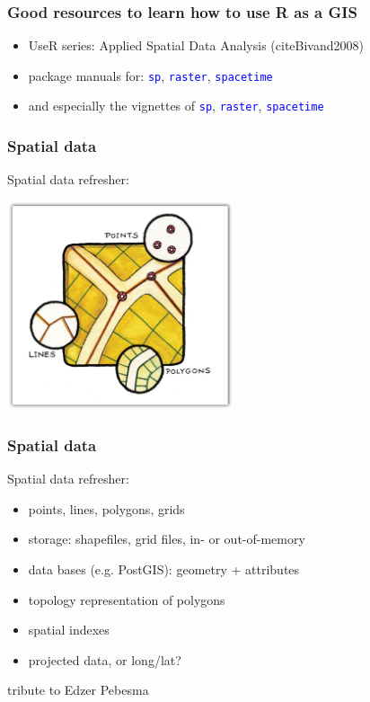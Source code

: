 \documentclass[xcolor=table, xcolor=dvipsnames]{beamer}\usepackage[]{graphicx}\usepackage[]{color}
\newcommand{\rcode}[1]{\texttt{\textcolor{Blue}{#1}}} %
\begin{document}
\begin{frame}[fragile]\frametitle{Good resources to learn how to use R as a GIS}
\begin{itemize}[<+->]
\item UseR series: Applied Spatial Data Analysis (cite{Bivand2008})
\item package manuals for: \rcode{sp}, \rcode{raster}, \rcode{spacetime}
\item and especially the vignettes of \rcode{sp}, \rcode{raster}, \rcode{spacetime}
\end{itemize}
\end{frame}


\begin{frame}[fragile]\frametitle{Spatial data}
Spatial data refresher:\\
\begin{center}
\includegraphics[width=0.5\textwidth]{./externalfig/gis_datatypes.jpg}
\end{center}
\end{frame}


\begin{frame}[fragile]\frametitle{Spatial data}
Spatial data refresher:
\begin{itemize}[<+->]
\item points, lines, polygons, grids
\item storage: shapefiles, grid files, in- or out-of-memory
\item data bases (e.g. PostGIS): geometry + attributes
\item topology representation of polygons
\item spatial indexes
\item projected data, or long/lat?
\end{itemize}
\tiny{tribute to Edzer Pebesma}
\end{frame}
\end{document}

